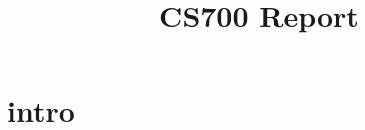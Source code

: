 \documentclass{article}
\begin{document}
	\title{CS700 Report}
	\maketitle
	\section{intro}
\end{document}
